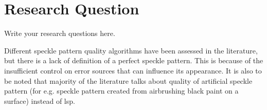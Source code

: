 \chapter{Research Question}\label{chap:research_question}

Write your research questions here.

Different speckle pattern quality algorithms have been assessed in the literature, but there is a lack of definition of a perfect speckle pattern. This is because of the insufficient control on error sources that can influence its appearance. It is also to be noted that majority of the literature talks about quality of artificial speckle pattern (for e.g. speckle pattern created from airbrushing black paint on a surface) instead of \gls{lsp}. 